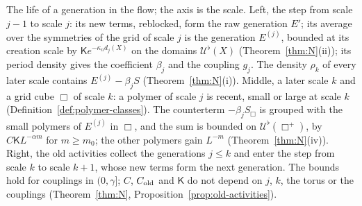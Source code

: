 \begin{gfigure}[tp]
\begin{tikzpicture}
\end{tikzpicture}
\caption{The life of a generation in the flow; the axis is the scale. Left, the step from scale $j-1$ to scale $j$: its new terms, reblocked, form the raw generation $E'$; its average over the symmetries of the grid of scale $j$ is the generation $E^{(j)}$, bounded at its creation scale by $\mathsf Ke^{-\kappa_nd_j(X)}$ on the domains $\mathcal U^\flat(X)$ (Theorem~\ref{thm:N}(ii)); its period density gives the coefficient $\beta_j$ and the coupling $g_j$. The density $\rho_k$ of every later scale contains $E^{(j)}-\beta_jS$ (Theorem~\ref{thm:N}(i)). Middle, a later scale $k$ and a grid cube $\Box$ of scale $k$: a polymer of scale $j$ is recent, small or large at scale $k$ (Definition~\ref{def:polymer-classes}). The counterterm $-\beta_jS_\Box$ is grouped with the small polymers of $E^{(j)}$ in $\Box$, and the sum is bounded on $\mathcal U^\flat(\Box^+)$, by $C\mathsf KL^{-\alpha m}$ for $m\ge m_0$; the other polymers gain $L^{-m}$ (Theorem~\ref{thm:N}(iv)). Right, the old activities collect the generations $j\le k$ and enter the step from scale $k$ to scale $k+1$, whose new terms form the next generation. The bounds hold for couplings in $(0,\gamma]$; $C$, $C_{\rm old}$ and $\mathsf K$ do not depend on $j$, $k$, the torus or the couplings (Theorem~\ref{thm:N}, Proposition~\ref{prop:old-activities}).}
\label{fig:G-generation}
\end{gfigure}
